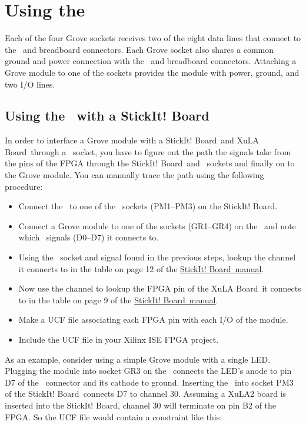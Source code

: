 \documentclass[letterpaper,11pt,oneside]{memoir}
\newcommand{\xula}{XuLA Board}
\newcommand{\stickit}{StickIt! Board}
\begin{document}



\chapter{Using the \product}

Each of the four Grove sockets receives two of the eight data lines that connect to the 
\digpmod\ and breadboard connectors.
Each Grove socket also shares a common ground and power connection with the \digpmod\ and
breadboard connectors.
Attaching a Grove module to one of the sockets provides the module with power, ground, and two I/O lines.


\section{Using the \product\ with a \stickit}

In order to interface a Grove module with a \stickit\ and \xula\ through a \digpmod\ socket, you have to figure out
the path the signals take from the pins of the FPGA through the \stickit\ and \digpmod\ sockets and finally on to the Grove module. 
You can manually trace the path using the following procedure:

\begin{itemize}
\item Connect the \product\ to one of the \digpmod\ sockets (PM1--PM3) on the \stickit.
\item \label{itm:groveconnect} Connect a Grove module to one of the sockets (GR1--GR4) on the \product\ and 
    note which \digpmod\ signals (D0--D7) it connects to.
\item Using the \digpmod\ socket and signal found in the previous steps, lookup
    the channel it connects to in the table on page 12 of the \href{http://www.xess.com/static/media/manuals/StickIt-manual-v4_0.pdf}{\stickit\ manual}.
\item Now use the channel to lookup the FPGA pin of the \xula\ it connects to in the
	table on page 9 of the \href{http://www.xess.com/static/media/manuals/StickIt-manual-v4_0.pdf}{\stickit\ manual}.
\item Make a UCF file associating each FPGA pin with each I/O of the module.
\item Include the UCF file in your Xilinx ISE FPGA project.
\end{itemize}

As an example, consider using a simple Grove module with a single LED.
Plugging the module into socket GR3 on the \product\ connects the LED's anode to pin D7 of the \digpmod\ connector
and its cathode to ground.
Inserting the \product\ into socket PM3 of the \stickit\ connects D7 to channel 30.
Assuming a XuLA2 board is inserted into the \stickit, channel 30 will terminate on
pin B2 of the FPGA.
So the UCF file would contain a constraint like this:
\end{document}
